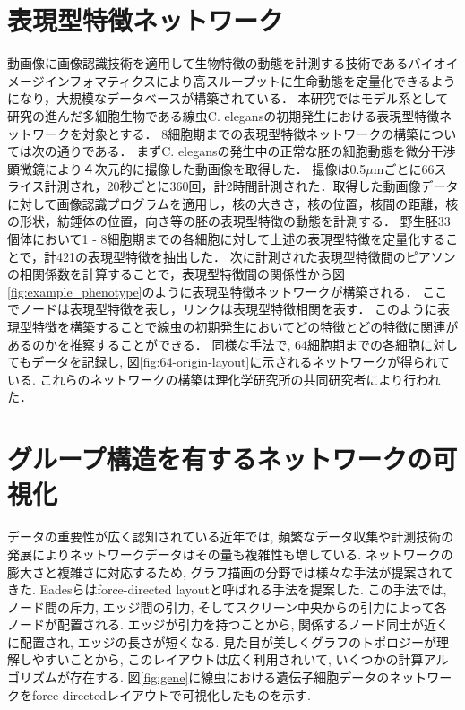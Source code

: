 \documentclass{kuee}
\begin{document}
\section{表現型特徴ネットワーク}
\label{sec:vis_bio}
動画像に画像認識技術を適用して生物特徴の動態を計測する技術であるバイオイメージインフォマティクスにより高スループットに生命動態を定量化できるようになり，大規模なデータベースが構築されている．
本研究ではモデル系として研究の進んだ多細胞生物である線虫C. elegansの初期発生における表現型特徴ネットワークを対象とする．
8細胞期までの表現型特徴ネットワークの構築については次の通りである．
まずC. elegansの発生中の正常な胚の細胞動態を微分干渉顕微鏡により４次元的に撮像した動画像を取得した．
撮像は0.5$\mu$mごとに66スライス計測され，20秒ごとに360回，計2時間計測された．取得した動画像データに対して画像認識プログラムを適用し，核の大きさ，核の位置，核間の距離，核の形状，紡錘体の位置，向き等の胚の表現型特徴の動態を計測する．
野生胚33個体において1 - 8細胞期までの各細胞に対して上述の表現型特徴を定量化することで，計421の表現型特徴を抽出した．
次に計測された表現型特徴間のピアソンの相関係数を計算することで，表現型特徴間の関係性から図\ref{fig:example_phenotype}のように表現型特徴ネットワークが構築される．
ここでノードは表現型特徴を表し，リンクは表現型特徴相関を表す．
このように表現型特徴を構築することで線虫の初期発生においてどの特徴とどの特徴に関連があるのかを推察することができる．
同様な手法で, 64細胞期までの各細胞に対してもデータを記録し, 図\ref{fig:64-origin-layout}に示されるネットワークが得られている.
これらのネットワークの構築は理化学研究所の共同研究者により行われた．

\section{グループ構造を有するネットワークの可視化}
\label{sec:graph_for_group_structure}
データの重要性が広く認知されている近年では, 頻繁なデータ収集や計測技術の発展によりネットワークデータはその量も複雑性も増している.
ネットワークの膨大さと複雑さに対応するため, グラフ描画の分野では様々な手法が提案されてきた.
Eadesらはforce-directed layoutと呼ばれる手法を提案した\cite{eades84}.
この手法では, ノード間の斥力, エッジ間の引力, そしてスクリーン中央からの引力によって各ノードが配置される.
エッジが引力を持つことから, 関係するノード同士が近くに配置され, エッジの長さが短くなる.
見た目が美しくグラフのトポロジーが理解しやすいことから, このレイアウトは広く利用されいて\cite{Kobourov2013ForceDirectedDA}, いくつかの計算アルゴリズムが存在する\cite{harel2000fast,koren2003drawing,hachul2004drawing}.
図\ref{fig:gene}に線虫における遺伝子細胞データのネットワークをforce-directedレイアウトで可視化したものを示す.
\end{document}
